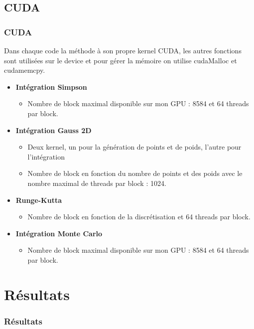 \documentclass[10pt]{beamer}
\begin{document}
\subsection{CUDA}
\begin{frame}
    \frametitle{CUDA}
        \small
    Dans chaque code la méthode à son propre kernel CUDA, les autres fonctions sont utilisées sur le device et pour gérer la mémoire on utilise cudaMalloc et cudamemcpy.
    \begin{itemize}
     \item \textbf{Intégration Simpson}
            \begin{itemize}
                \item Nombre de block maximal disponible sur mon GPU : 8584 et 64 threads par block.
            \end{itemize}
        \item \textbf{Intégration Gauss 2D}
            \begin{itemize}
                \item Deux kernel, un pour la génération de points et de poids, l'autre pour l'intégration
                \item Nombre de block en fonction du nombre de points et des poids avec le nombre maximal de threads par block : 1024. 
            \end{itemize}
        \item \textbf{Runge-Kutta}
            \begin{itemize}
                \item Nombre de block en fonction de la discrétisation et 64 threads par block.
            \end{itemize}
        \item \textbf{Intégration Monte Carlo }
            \begin{itemize}
                \item Nombre de block maximal disponible sur mon GPU : 8584 et 64 threads par block.
            \end{itemize}
        
       
    \end{itemize}
\end{frame}

\section{Résultats}

\begin{frame}
    \frametitle{Résultats}
    \tableofcontents[currentsection]
\end{frame}
\end{document}
